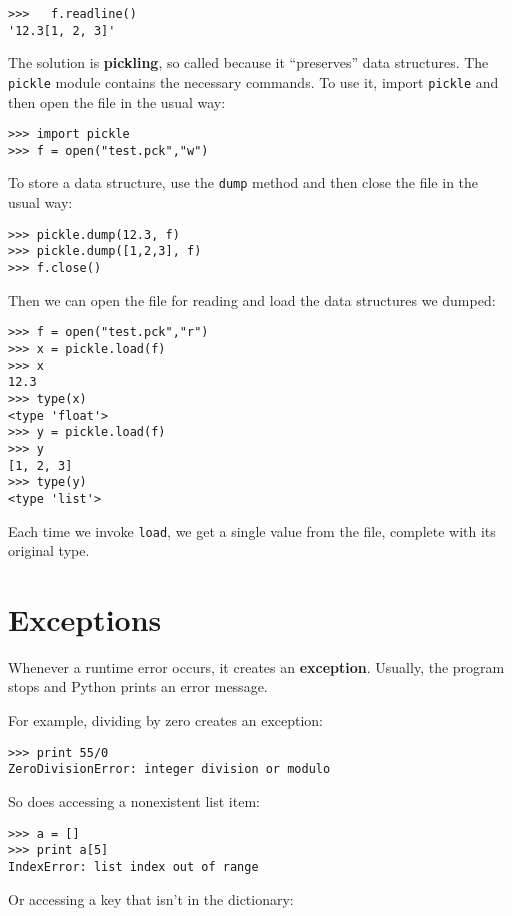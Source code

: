\beforeverb
\begin{verbatim}
>>>   f.readline()
'12.3[1, 2, 3]'
\end{verbatim}
\afterverb
%
The solution is {\bf pickling}, so called because it ``preserves''
data structures.  The {\tt pickle} module contains the necessary
commands.  To use it, import {\tt pickle} and then open the file in
the usual way:

\beforeverb
\begin{verbatim}
>>> import pickle
>>> f = open("test.pck","w")
\end{verbatim}
\afterverb
%
To store a data structure, use the {\tt dump} method and
then close the file in the usual way:

\beforeverb
\begin{verbatim}
>>> pickle.dump(12.3, f)
>>> pickle.dump([1,2,3], f)
>>> f.close()
\end{verbatim}
\afterverb
%
Then we can open the file for reading and load the data structures
we dumped:

\beforeverb
\begin{verbatim}
>>> f = open("test.pck","r")
>>> x = pickle.load(f)
>>> x
12.3
>>> type(x)
<type 'float'>
>>> y = pickle.load(f)
>>> y
[1, 2, 3]
>>> type(y)
<type 'list'>
\end{verbatim}
\afterverb
%
Each time we invoke {\tt load}, we get a single value from
the file, complete with its original type.


\section{Exceptions}

Whenever a runtime error occurs, it creates an
{\bf exception}.  Usually, the program stops and Python
prints 
an error message.

For example, dividing by zero creates an exception:

\beforeverb
\begin{verbatim}
>>> print 55/0
ZeroDivisionError: integer division or modulo
\end{verbatim}
\afterverb
%
So does accessing a nonexistent list item:

\beforeverb
\begin{verbatim}
>>> a = []
>>> print a[5]
IndexError: list index out of range
\end{verbatim}
\afterverb
%
Or accessing a key that isn't in the dictionary:

